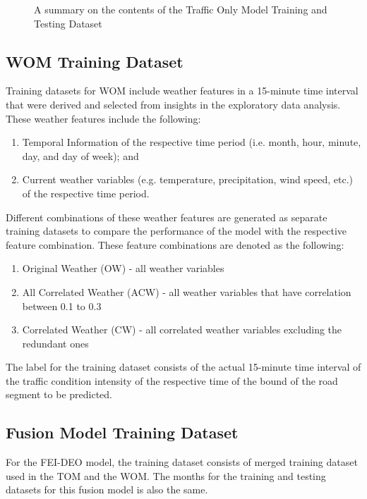 \begin{figure}
\centering
\captionsetup{justification=centering}
\caption{A summary on the contents of the Traffic Only Model Training and Testing Dataset}
\label{fig:TOM_TrainingTestingInput}
\end{figure}

\subsection{WOM Training Dataset}
Training datasets for WOM include weather features in a 15-minute time interval that were derived and selected from insights in the exploratory data analysis. These weather features include the following:
\begin{enumerate}
\item Temporal Information of the respective time period (i.e. month, hour, minute, day, and day of week); and
\item Current weather variables (e.g. temperature, precipitation, wind speed, etc.) of the respective time period.
\end{enumerate}

Different combinations of these weather features are generated as separate training datasets to compare the performance of the model with the respective feature combination. These feature combinations are denoted as the following: 
\begin{enumerate}
\item Original Weather (OW) - all weather variables
\item All Correlated Weather (ACW) - all weather variables that have correlation between 0.1 to 0.3
\item Correlated Weather (CW) - all correlated weather variables excluding the redundant ones
\end{enumerate}

The label for the training dataset consists of the actual 15-minute time interval of the traffic condition intensity of the respective time of the bound of the road segment to be predicted.

\subsection{Fusion Model Training Dataset}
For the FEI-DEO model, the training dataset consists of merged training dataset used in the TOM and the WOM. The months for the training and testing datasets for this fusion model is also the same.

